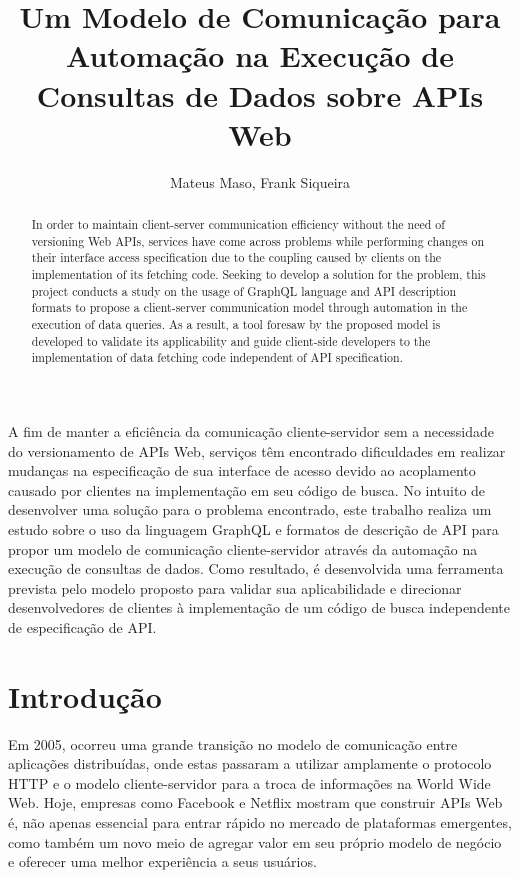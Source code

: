 \documentclass[12pt]{article}
\title{Um Modelo de Comunicação para Automação na Execução de Consultas de Dados sobre APIs Web}
\author{Mateus Maso\inst{1}, Frank Siqueira\inst{2}}
\begin{document}
 
  \maketitle
  \begin{abstract}
    In order to maintain client-server communication efficiency without the need of versioning Web APIs, services have come across problems while performing changes on their interface access specification due to the coupling caused by clients on the implementation of its fetching code. Seeking to develop a solution for the problem, this project conducts a study on the usage of GraphQL language and API description formats to propose a client-server communication model through automation in the execution of data queries. As a result, a tool foresaw by the proposed model is developed to validate its applicability and guide client-side developers to the implementation of data fetching code independent of API specification.
  \end{abstract}

  \begin{resumo} 
    A fim de manter a eficiência da comunicação cliente-servidor sem a necessidade do versionamento de APIs Web, serviços têm encontrado dificuldades em realizar mudanças na especificação de sua interface de acesso devido ao acoplamento causado por clientes na implementação em seu código de busca. No intuito de desenvolver uma solução para o problema encontrado, este trabalho realiza um estudo sobre o uso da linguagem GraphQL e formatos de descrição de API para propor um modelo de comunicação cliente-servidor através da automação na execução de consultas de dados. Como resultado, é desenvolvida uma ferramenta prevista pelo modelo proposto para validar sua aplicabilidade e direcionar desenvolvedores de clientes à implementação de um código de busca independente de especificação de API.
  \end{resumo}

  \section{Introdução}

  Em 2005, ocorreu uma grande transição no modelo de comunicação entre aplicações distribuídas, onde estas passaram a utilizar amplamente o protocolo HTTP e o modelo cliente-servidor para a troca de informações na World Wide Web. Hoje, empresas como Facebook e Netflix mostram que construir APIs Web é, não apenas essencial para entrar rápido no mercado de plataformas emergentes, como também um novo meio de agregar valor em seu próprio modelo de negócio e oferecer uma melhor experiência a seus usuários. \cite{Duvander2013-2, Art2016}
  
\end{document}
